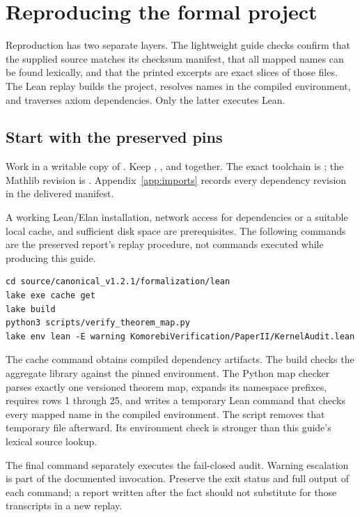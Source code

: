 \section{Reproducing the formal project}\label{sec:replay}

Reproduction has two separate layers. The lightweight guide checks confirm that the supplied source matches its checksum manifest, that all mapped names can be found lexically, and that the printed excerpts are exact slices of those files. The Lean replay builds the project, resolves names in the compiled environment, and traverses axiom dependencies. Only the latter executes Lean.

\subsection{Start with the preserved pins}

Work in a writable copy of . Keep , , and  together. The exact toolchain is ; the Mathlib revision is . Appendix~\ref{app:imports} records every dependency revision in the delivered manifest.

A working Lean/Elan installation, network access for dependencies or a suitable local cache, and sufficient disk space are prerequisites. The following commands are the preserved report's replay procedure, not commands executed while producing this guide.
\begin{Verbatim}[fontsize=\small,frame=leftline,rulecolor=\color{teal},framesep=6pt,breaklines=true]
cd source/canonical_v1.2.1/formalization/lean
lake exe cache get
lake build
python3 scripts/verify_theorem_map.py
lake env lean -E warning KomorebiVerification/PaperII/KernelAudit.lean
\end{Verbatim}

The cache command obtains compiled dependency artifacts. The build checks the aggregate library against the pinned environment. The Python map checker parses exactly one versioned theorem map, expands its namespace prefixes, requires rows 1 through 25, and writes a temporary Lean command that checks every mapped name in the compiled environment. The script removes that temporary file afterward. Its environment check is stronger than this guide's lexical source lookup.

The final command separately executes the fail-closed audit. Warning escalation is part of the documented invocation. Preserve the exit status and full output of each command; a report written after the fact should not substitute for those transcripts in a new replay.

